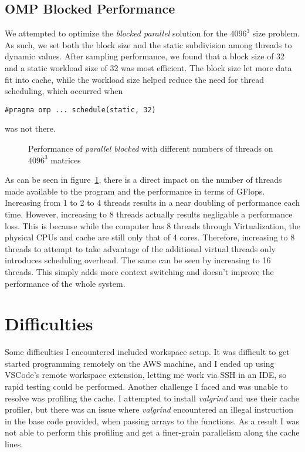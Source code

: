 \documentclass[letterpaper,twocolumn,10pt]{article}
\begin{document}
\subsection{OMP Blocked Performance}
We attempted to optimize the \textit{blocked parallel} solution for the $4096^3$
size problem. As such, we set both the block size and the static subdivision
among threads to dynamic values. After sampling performance, we found that a block
size of 32 and a static workload size of 32 was most efficient. The block size
let more data fit into cache, while the workload size helped reduce the need for
thread scheduling, which occurred when
\begin{verbatim}
#pragma omp ... schedule(static, 32)
\end{verbatim}
was not there.
\begin{figure}
    \caption{\label{fig:threads} Performance of \textit{parallel blocked} with 
    different numbers of threads on $4096^3$ matrices}
  \end{figure}
As can be seen in figure~\ref{fig:threads}, there is a direct impact on the number
of threads made available to the program and the performance in terms of GFlops.
Increasing from 1 to 2 to 4 threads results in a near doubling of performance each
time. However, increasing to 8 threads actually results negligable a performance loss.
This is because while the computer has 8 threads through Virtualization, the physical
CPUs and cache are still only that of 4 cores. Therefore, increasing to 8 threads to
attempt to take advantage of the additional virtual threads only introduces scheduling
overhead. The same can be seen by increasing to 16 threads. This simply adds more
context switching and doesn't improve the performance of the whole system.
\section{Difficulties}
Some difficulties I encountered included workspace setup. It was difficult to get
started programming remotely on the AWS machine, and I ended up using VSCode's
remote workspace extension, letting me work via SSH in an IDE, so rapid testing could
be performed. Another challenge I faced and was unable to resolve was profiling
the cache. I attempted to install \textit{valgrind} and use their cache profiler,
but there was an issue where \textit{valgrind} encountered an illegal instruction
in the base code provided, when passing arrays to the functions. As a result I was
not able to perform this profiling and get a finer-grain parallelism along the cache lines.
\end{document}
